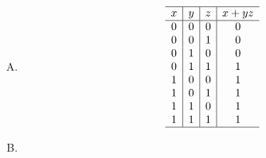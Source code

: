 {{\begin{practices}
\begin{enumerate}[A.]
{\begin{table}[H]
                        \[
                            \begin{array}{c|c|c|c}
                                \hline
                                x & y & z & \overline{x}y \\
                                \hline
                                0 & 0 & 0 & 0 \\
                                0 & 0 & 1 & 0 \\
                                0 & 1 & 0 & 1 \\
                                0 & 1 & 1 & 1 \\
                                1 & 0 & 0 & 0 \\
                                1 & 0 & 1 & 0 \\
                                1 & 1 & 0 & 0 \\
                                1 & 1 & 1 & 0 \\
                                \hline
                            \end{array}
                        \]
                    \end{table}
                }
                \item
                {
                    \begin{table}[H]
                        \centering

                        \[
                            \begin{array}{c|c|c|c}
                                \hline
                                x & y & z & x + yz \\
                                \hline
                                0 & 0 & 0 & 0 \\
                                0 & 0 & 1 & 0 \\
                                0 & 1 & 0 & 0 \\
                                0 & 1 & 1 & 1 \\
                                1 & 0 & 0 & 1 \\
                                1 & 0 & 1 & 1 \\
                                1 & 1 & 0 & 1 \\
                                1 & 1 & 1 & 1 \\
                                \hline
                            \end{array}
                        \]
                    \end{table}
                }
                \item
                {
                    \begin{table}[H]
                        \centering


\end{table}}
\end{enumerate}
\end{practices}}}
